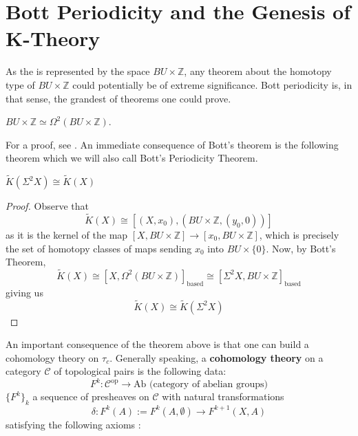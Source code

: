 \documentclass[11pt,a4paper]{article}
\begin{document}
\section*{Bott Periodicity and the Genesis of K-Theory}
As the  is represented by the space $BU\times\mathbb Z$, any theorem about the homotopy type of $BU\times\mathbb Z$ could potentially be of extreme significance. Bott periodicity is, in that sense, the grandest of theorems one could prove.
\begin{theorem}
$BU\times \mathbb{Z} \simeq \Omega^2(BU\times \mathbb{Z})$.
\end{theorem}

For a proof, see \cite{milnor2016morse}. An immediate consequence of Bott's theorem is the following theorem which we will also call Bott's Periodicity Theorem.
\begin{theorem}
    $\widetilde{K}(\Sigma^2X) \cong \widetilde{K}(X)$
\end{theorem}

\begin{proof}
    Observe that
    $$\widetilde{K}(X) \cong [(X, x_0), (BU\times \mathbb{Z}, (y_0, 0))]$$
    as it is the kernel of the map $[X, BU\times \mathbb{Z}] \rightarrow [x_0, BU\times \mathbb{Z}]$, which is precisely the set of homotopy classes of maps sending $x_0$ into $BU\times \{0\}$. Now, by Bott's Theorem,
    $$\widetilde{K}(X) \cong [X, \Omega^2(BU\times \mathbb{Z})]_{\text{based}} \cong [\Sigma^2X, BU\times \mathbb{Z}]_{\text{based}}$$
    giving us
    $$\widetilde{K}(X) \cong \widetilde{K}(\Sigma^2X)$$
\end{proof}


An important consequence of the theorem above is that one can build a cohomology theory on $\tau_c$. Generally speaking, a \textbf{cohomology theory} on a category $\mathcal{C}$ of topological pairs is the following data:
$$F^k: \mathcal{C}^{\text{op}} \rightarrow \text{Ab (category of abelian groups)}$$
$\{F^k\}_{k}$ a sequence of presheaves on $\mathcal{C}$ with natural transformations
$$\delta: F^k(A) := F^k(A, \emptyset) \rightarrow F^{k+1}(X, A)$$
satisfying the following axioms \cite{eilenberg1945axiomatic}:
\end{document}
